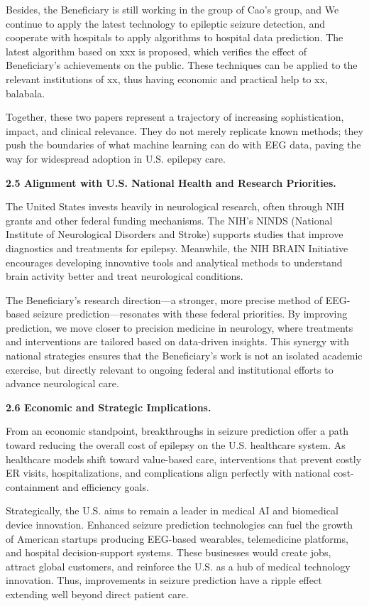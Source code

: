 \documentclass{article}
\begin{document}
Besides, the Beneficiary is still working in the group of Cao's group, and We continue to apply the latest technology to epileptic seizure detection, and cooperate with hospitals to apply algorithms to hospital data prediction. The latest algorithm based on xxx is proposed, which verifies the effect of Beneficiary's achievements on the public. These techniques can be applied to the relevant institutions of xx, thus having economic and practical help to xx, balabala.


Together, these two papers represent a trajectory of increasing sophistication, impact, and clinical relevance. They do not merely replicate known methods; they push the boundaries of what machine learning can do with EEG data, paving the way for widespread adoption in U.S. epilepsy care.

{\bf 2.5 Alignment with U.S. National Health and Research Priorities. }

The United States invests heavily in neurological research, often through NIH grants and other federal funding mechanisms. The NIH’s NINDS (National Institute of Neurological Disorders and Stroke) supports studies that improve diagnostics and treatments for epilepsy. Meanwhile, the NIH BRAIN Initiative encourages developing innovative tools and analytical methods to understand brain activity better and treat neurological conditions.

The Beneficiary’s research direction—a stronger, more precise method of EEG-based seizure prediction—resonates with these federal priorities. By improving prediction, we move closer to precision medicine in neurology, where treatments and interventions are tailored based on data-driven insights. This synergy with national strategies ensures that the Beneficiary’s work is not an isolated academic exercise, but directly relevant to ongoing federal and institutional efforts to advance neurological care.


{\bf 2.6 Economic and Strategic Implications. }

From an economic standpoint, breakthroughs in seizure prediction offer a path toward reducing the overall cost of epilepsy on the U.S. healthcare system. As healthcare models shift toward value-based care, interventions that prevent costly ER visits, hospitalizations, and complications align perfectly with national cost-containment and efficiency goals.

Strategically, the U.S. aims to remain a leader in medical AI and biomedical device innovation. Enhanced seizure prediction technologies can fuel the growth of American startups producing EEG-based wearables, telemedicine platforms, and hospital decision-support systems. These businesses would create jobs, attract global customers, and reinforce the U.S. as a hub of medical technology innovation. Thus, improvements in seizure prediction have a ripple effect extending well beyond direct patient care.
\end{document}
